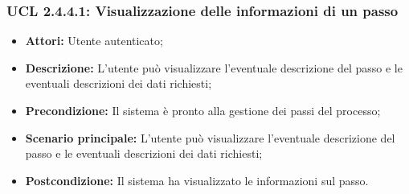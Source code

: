 \subsubsection{UCL 2.4.4.1: Visualizzazione delle informazioni di un passo}
\begin{itemize}
\item \textbf{Attori:} Utente autenticato;
\item \textbf{Descrizione:} L'utente può visualizzare l'eventuale descrizione del passo e le eventuali descrizioni dei dati richiesti;
\item \textbf{Precondizione:} Il sistema è pronto alla gestione dei passi del processo;
\item \textbf{Scenario principale:} L'utente può visualizzare l'eventuale descrizione del passo e le eventuali descrizioni dei dati richiesti;
\item \textbf{Postcondizione:} Il sistema ha visualizzato le informazioni sul passo.
\end{itemize}

\hypertarget{L2.4.4.2}{}
